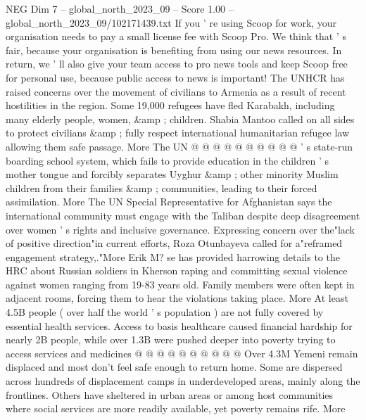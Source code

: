 \begin{textsample}{NEG Dim 7 – global\_north\_2023\_09 – Score 1.00 – global\_north\_2023\_09/102171439.txt}
If you ' re using Scoop for work, your organisation needs to pay a small license fee with Scoop Pro.
We think that ' s fair, because your organisation is benefiting from using our news resources.
In return, we ' ll also give your team access to pro news tools and keep Scoop free for personal use, because public access to news is important!
The UNHCR has raised concerns over the movement of civilians to Armenia as a result of recent hostilities in the region.
Some 19,000 refugees have fled Karabakh, including many elderly people, women, \&amp ; children.
Shabia Mantoo called on all sides to protect civilians \&amp ; fully respect international humanitarian refugee law allowing them safe passage.
More The UN @ @ @ @ @ @ @ @ @ @ ' s state-run boarding school system, which fails to provide education in the children ' s mother tongue and forcibly separates Uyghur \&amp ; other minority Muslim children from their families \&amp ; communities, leading to their forced assimilation.
More The UN Special Representative for Afghanistan says the international community must engage with the Taliban despite deep disagreement over women ' s rights and inclusive governance.
Expressing concern over the"lack of positive direction"in current efforts, Roza Otunbayeva called for a"reframed engagement strategy,."More Erik M? se has provided harrowing details to the HRC about Russian soldiers in Kherson raping and committing sexual violence against women ranging from 19-83 years old.
Family members were often kept in adjacent rooms, forcing them to hear the violations taking place.
More At least 4.5B people ( over half the world ' s population ) are not fully covered by essential health services.
Access to basis healthcare caused financial hardship for nearly 2B people, while over 1.3B were pushed deeper into poverty trying to access services and medicines @ @ @ @ @ @ @ @ @ @ Over 4.3M Yemeni remain displaced and most don't feel safe enough to return home.
Some are dispersed across hundreds of displacement camps in underdeveloped areas, mainly along the frontlines.
Others have sheltered in urban areas or among host communities where social services are more readily available, yet poverty remains rife.
More

\end{textsample}
